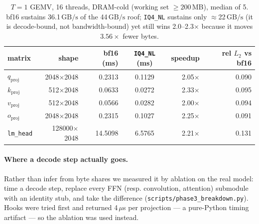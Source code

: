 \documentclass[11pt]{article}
\newcommand{\code}[1]{\texttt{\small #1}}
\newcommand{\gbps}{\ensuremath{\,\mathrm{GB/s}}}
\begin{document}
\begin{table}[h]\centering\small
\begin{tabular}{lrrcrr}
\toprule
matrix & shape & bf16 (ms) & \code{IQ4\_NL} (ms) & speedup & rel $L_2$ vs bf16 \\
\midrule
$q_{\mathrm{proj}}$ & 2048$\times$2048 & 0.2313 & 0.1129 & 2.05$\times$ & 0.090 \\
$k_{\mathrm{proj}}$ & 512$\times$2048  & 0.0633 & 0.0272 & 2.33$\times$ & 0.095 \\
$v_{\mathrm{proj}}$ & 512$\times$2048  & 0.0566 & 0.0282 & 2.00$\times$ & 0.094 \\
$o_{\mathrm{proj}}$ & 2048$\times$2048 & 0.2315 & 0.1027 & 2.25$\times$ & 0.091 \\
\code{lm\_head} & 128000$\times$2048 & 14.5098 & 6.5765 & 2.21$\times$ & 0.131 \\
\bottomrule
\end{tabular}
\caption{$T{=}1$ GEMV, 16 threads, DRAM-cold (working set $\ge200$\,MB), median of 5.
bf16 sustains 36.1\gbps{} of the 44\gbps{} roof; \code{IQ4\_NL} sustains only
$\approx$22\gbps{} (it is decode-bound, not bandwidth-bound) yet still wins 2.0--2.3$\times$
because it moves $3.56\times$ fewer bytes.}
\end{table}

\paragraph{Where a decode step actually goes.} Rather than infer from byte shares we
measured it by ablation on the real model: time a decode step, replace every FFN (resp.
convolution, attention) submodule with an identity stub, and take the difference
(\code{scripts/phase3\_breakdown.py}). Hooks were tried first and returned 4\,$\mu$s per
projection --- a pure-Python timing artifact --- so the ablation was used instead.
\end{document}
